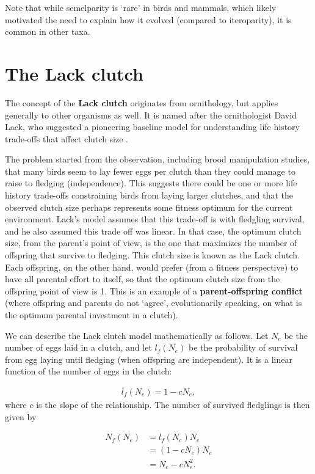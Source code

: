 \documentclass[
]{book}
\begin{document}
Note that while semelparity is `rare' in birds and mammals, which likely motivated the need to explain how it evolved (compared to iteroparity), it is common in other taxa.

\hypertarget{the-lack-clutch}{%
\section{The Lack clutch}\label{the-lack-clutch}}

The concept of the \textbf{Lack clutch} originates from ornithology, but applies generally to other organisms as well. It is named after the ornithologist David Lack, who suggested a pioneering baseline model for understanding life history trade-offs that affect clutch size \citep{Lack1}.

The problem started from the observation, including brood manipulation studies, that many birds seem to lay fewer eggs per clutch than they could manage to raise to fledging (independence). This suggests there could be one or more life history trade-offs constraining birds from laying larger clutches, and that the observed clutch size perhaps represents some fitness optimum for the current environment. Lack's model assumes that this trade-off is with fledgling survival, and he also assumed this trade off was linear. In that case, the optimum clutch size, from the parent's point of view, is the one that maximizes the number of offspring that survive to fledging. This clutch size is known as the Lack clutch. Each offspring, on the other hand, would prefer (from a fitness perspective) to have all parental effort to itself, so that the optimum clutch size from the offspring point of view is 1. This is an example of a \textbf{parent-offspring conflict} (where offspring and parents do not `agree', evolutionarily speaking, on what is the optimum parental investment in a clutch).

We can describe the Lack clutch model mathematically as follows. Let \(N_e\) be the number of eggs laid in a clutch, and let \(l_f(N_e)\) be the probability of survival from egg laying until fledging (when offspring are independent). It is a linear function of the number of eggs in the clutch:

\begin{align}
l_f(N_e)=1-cN_e,
\end{align}
where \(c\) is the slope of the relationship. The number of survived fledglings is then given by

\begin{align}
N_f(N_e)&=l_f(N_e)N_e\\
&=(1-cN_e)N_e\\
&=N_e-cN_e^2.
\end{align}
\end{document}
